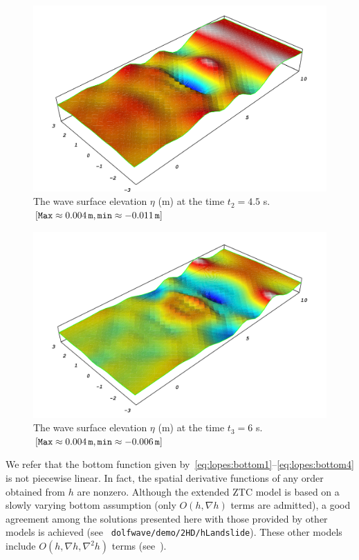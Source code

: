 \begin{figure}
\begin{center}
\includegraphics[width=\largefig]{chapters/lopes/pdf/eta45.pdf}
\caption{The wave surface elevation $\eta$ (m)
   at the time  $t_2=4.5$ s. $[{\tt Max}\approx 0.004\, {\tt m},
    {\tt min}\approx-0.011\, {\tt m}]$}
\label{fig:lopes:objectsurface2}
\end{center}
\end{figure}
\begin{figure}
\begin{center}
\includegraphics[width=\largefig]{chapters/lopes/pdf/eta6.pdf}
\caption{The  wave surface elevation $\eta$ (m)
   at the time  $t_3=6$ s. $[{\tt Max}\approx 0.004\, {\tt m},
    {\tt min}\approx -0.006\,{\tt m}]$}
\label{fig:lopes:objectsurface3}
\end{center}
\end{figure}

We refer that the bottom function given
by~\eqref{eq:lopes:bottom1}--\eqref{eq:lopes:bottom4} is not
piecewise linear. In fact, the spatial derivative functions
of any order obtained from $h$ are nonzero. Although the
extended ZTC model is based on a slowly varying bottom
assumption (only $O(h,\nabla h)$ terms are admitted), a good
agreement among the solutions presented here with those
provided by other models is achieved (see {\tt
  dolfwave/demo/2HD/hLandslide}).  These other
models include $O(h,\nabla h,\nabla^2 h)$ terms
(see~\citet{LopesPereiraTrabucho}).


